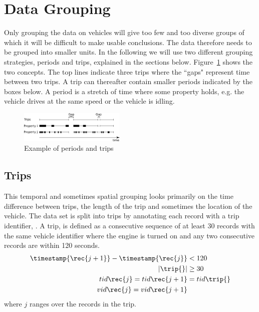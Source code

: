 \section{Data Grouping}
Only grouping the data on vehicles will give too few and too diverse groups of which it will be difficult to make usable conclusions. 
The data therefore needs to be grouped into smaller units.
In the following we will use two different grouping strategies, periods and trips, explained in the sections below.
Figure~\ref{fig:groupings} shows the two concepts.
The top lines indicate three trips where the ``gaps" represent time between two trips.
A trip can thereafter contain smaller periods indicated by the boxes below.
A period is a stretch of time where some property holds, e.g. the vehicle drives at the same speed or the vehicle is idling.

\begin{figure}[htb]
\centering
\includegraphics[width=0.45\textwidth]{../images/groupings.png}
\caption{Example of periods and trips}
\label{fig:groupings}
\end{figure}

\subsection{Trips}\label{sec:trips} 
This temporal and sometimes spatial grouping looks primarily on the time difference between trips, the length of the trip and sometimes the location of the vehicle.
The data set is split into trips by annotating each record with a trip identifier, \tid{\rec{}}.
A trip, \trip{} is defined as a consecutive sequence of at least 30 records with the same vehicle identifier where the engine is turned on and any two consecutive records are within 120 seconds.
\begin{align} %
\timestamp{\rec{j+1}}-\timestamp{\rec{j}}&< 120\nonumber\\
|\trip{}|&\geq 30\nonumber\\
\tid{\rec{j}}=\tid{\rec{j+1}}&=\tid{\trip{}}\nonumber\\
\vid{\rec{j}}=\vid{\rec{j+1}}\nonumber
\end{align}
where $j$ ranges over the records in the trip.

